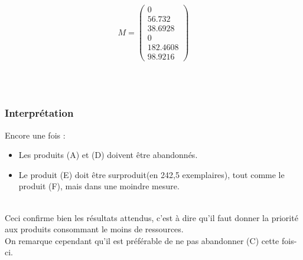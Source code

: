 \begin{displaymath}
	M = \left(
	\begin{array}{c}
		0\\
		56.732\\
		38.6928\\
		0\\
		182.4608\\
		98.9216 
	\end{array}
	\right)
\end{displaymath}
\begin{center}
	\\
	~\\
\end{center}

\subsubsection{Interprétation}
Encore une fois :
\begin{itemize}
	\item Les produits (A) et (D) doivent être abandonnés.
	\item Le produit (E) doit être \og surproduit\fg (en 242,5 exemplaires), tout comme le produit (F), mais dans
	une moindre mesure.
\end{itemize}
~\\
Ceci confirme bien les résultats attendus, c'est à dire qu'il faut donner la priorité aux produits consommant le moins de ressources.\\
On remarque cependant qu'il est préférable de ne pas abandonner (C) cette fois-ci.
